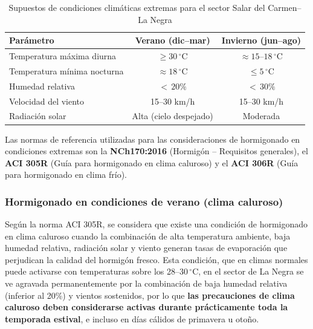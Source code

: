 \begin{table}[H]
  \centering
  \caption{Supuestos de condiciones climáticas extremas para el sector Salar del Carmen--La Negra}
  \label{tab:clima}
  \begin{tabular}{lcc}
    \toprule
    \textbf{Parámetro}               & \textbf{Verano (dic--mar)} & \textbf{Invierno (jun--ago)} \\
    \midrule
    Temperatura máxima diurna        & $\geq 30\,^\circ$C         & $\approx 15$--$18\,^\circ$C \\
    Temperatura mínima nocturna      & $\approx 18\,^\circ$C      & $\leq 5\,^\circ$C           \\
    Humedad relativa                 & $<\,20\%$                  & $<\,30\%$                   \\
    Velocidad del viento             & 15--30 km/h                & 15--30 km/h                 \\
    Radiación solar                  & Alta (cielo despejado)     & Moderada                    \\
    \bottomrule
  \end{tabular}
\end{table}

\noindent Las normas de referencia utilizadas para las consideraciones de hormigonado en condiciones extremas son la \textbf{NCh170:2016} (Hormigón -- Requisitos generales), el \textbf{ACI 305R} (Guía para hormigonado en clima caluroso) y el \textbf{ACI 306R} (Guía para hormigonado en clima frío).

\subsubsection{Hormigonado en condiciones de verano (clima caluroso)}

Según la norma ACI 305R, se considera que existe una condición de hormigonado en clima caluroso cuando la combinación de alta temperatura ambiente, baja humedad relativa, radiación solar y viento generan tasas de evaporación que perjudican la calidad del hormigón fresco. Esta condición, que en climas normales puede activarse con temperaturas sobre los 28--30\,$^\circ$C, en el sector de La Negra se ve agravada permanentemente por la combinación de baja humedad relativa (inferior al 20\%) y vientos sostenidos, por lo que \textbf{las precauciones de clima caluroso deben considerarse activas durante prácticamente toda la temporada estival}, e incluso en días cálidos de primavera u otoño.


